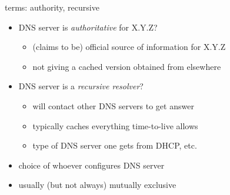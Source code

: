 \begin{frame}{terms: authority, recursive}
    \begin{itemize}
    \item DNS server is \textit{authoritative} for X.Y.Z?
        \begin{itemize}
        \item (claims to be) official source of information for X.Y.Z
        \item not giving a cached version obtained from elsewhere
        \end{itemize}
    \item DNS server is a \textit{recursive resolver}?
        \begin{itemize}
        \item will contact other DNS servers to get answer
        \item typically caches everything time-to-live allows
        \item type of DNS server one gets from DHCP, etc.
        \end{itemize}
    \vspace{.5cm}
    \item choice of whoever configures DNS server
    \item usually (but not always) mutually exclusive
    \end{itemize}
\end{frame}
